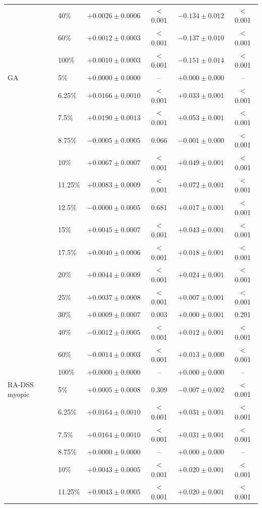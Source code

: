 \begin{tabular}{llcccc}
 & 40\% & $+0.0026\pm0.0006$ & $<$0.001 & $-0.134\pm0.012$ & $<$0.001 \\
 & 60\% & $+0.0012\pm0.0003$ & $<$0.001 & $-0.137\pm0.010$ & $<$0.001 \\
 & 100\% & $+0.0010\pm0.0003$ & $<$0.001 & $-0.151\pm0.014$ & $<$0.001 \\
\midrule
GA & 5\% & $+0.0000\pm0.0000$ & -- & $+0.000\pm0.000$ & -- \\
 & 6.25\% & $+0.0166\pm0.0010$ & $<$0.001 & $+0.033\pm0.001$ & $<$0.001 \\
 & 7.5\% & $+0.0190\pm0.0013$ & $<$0.001 & $+0.053\pm0.001$ & $<$0.001 \\
 & 8.75\% & $-0.0005\pm0.0005$ & 0.066 & $-0.001\pm0.000$ & $<$0.001 \\
 & 10\% & $+0.0067\pm0.0007$ & $<$0.001 & $+0.049\pm0.001$ & $<$0.001 \\
 & 11.25\% & $+0.0083\pm0.0009$ & $<$0.001 & $+0.072\pm0.001$ & $<$0.001 \\
 & 12.5\% & $-0.0000\pm0.0005$ & 0.681 & $+0.017\pm0.001$ & $<$0.001 \\
 & 15\% & $+0.0045\pm0.0007$ & $<$0.001 & $+0.043\pm0.001$ & $<$0.001 \\
 & 17.5\% & $+0.0040\pm0.0006$ & $<$0.001 & $+0.018\pm0.001$ & $<$0.001 \\
 & 20\% & $+0.0044\pm0.0009$ & $<$0.001 & $+0.024\pm0.001$ & $<$0.001 \\
 & 25\% & $+0.0037\pm0.0008$ & $<$0.001 & $+0.007\pm0.001$ & $<$0.001 \\
 & 30\% & $+0.0009\pm0.0007$ & 0.003 & $+0.000\pm0.001$ & 0.201 \\
 & 40\% & $-0.0012\pm0.0005$ & $<$0.001 & $+0.012\pm0.001$ & $<$0.001 \\
 & 60\% & $-0.0014\pm0.0003$ & $<$0.001 & $+0.013\pm0.000$ & $<$0.001 \\
 & 100\% & $+0.0000\pm0.0000$ & -- & $+0.000\pm0.000$ & -- \\
\midrule
RA-DSS myopic & 5\% & $+0.0005\pm0.0008$ & 0.309 & $-0.007\pm0.002$ & $<$0.001 \\
 & 6.25\% & $+0.0164\pm0.0010$ & $<$0.001 & $+0.031\pm0.001$ & $<$0.001 \\
 & 7.5\% & $+0.0164\pm0.0010$ & $<$0.001 & $+0.031\pm0.001$ & $<$0.001 \\
 & 8.75\% & $+0.0000\pm0.0000$ & -- & $+0.000\pm0.000$ & -- \\
 & 10\% & $+0.0043\pm0.0005$ & $<$0.001 & $+0.020\pm0.001$ & $<$0.001 \\
 & 11.25\% & $+0.0043\pm0.0005$ & $<$0.001 & $+0.020\pm0.001$ & $<$0.001 \\

\end{tabular}
